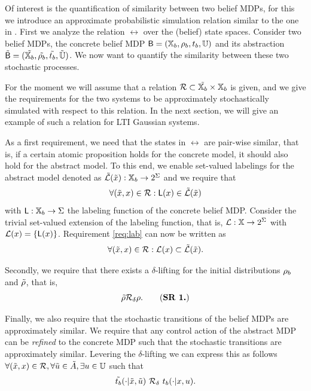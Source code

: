 \documentclass{ifacconf}
\begin{document}
 Of interest is the quantification of similarity between two belief MDPs, for this we introduce an approximate probabilistic simulation relation similar to the one in \citep{haesaert2017verification}.
   First we analyze the relation $\rel$ over the (belief) state spaces.
\color{blue} Consider two belief MDPs, the concrete belief MDP $\mathsf{B}= ({{\mathbb{X}}_b}, \rho_b, t_b, {\mathbb{U}})$  and its abstraction $\tilde {\mathsf{B}}=(\tilde{{{\mathbb{X}}_b}}, \tilde{\rho_b}, \tilde{t_b}, \tilde{{\mathbb{U}}})$. 
We now want to quantify the similarity between these two stochastic processes.

  For the moment we will assume that a relation $\mathcal{R}\subset \tilde {{{\mathbb{X}}_b}} \times {{\mathbb{X}}_b}$ is given, and we give the requirements for the two systems to be approximately stochastically simulated with respect to this relation. In the next section, we will give an example of such a relation for LTI Gaussian systems. 

As a first requirement, we need that the states in $\rel$ are pair-wise similar, that is, if a certain atomic proposition holds for the concrete model, it should also hold for the abstract model. To this end, we enable set-valued labelings for the abstract model denoted as  $ \tilde{\mathcal{L}}(\tilde x):{{\mathbb{X}}_b}\rightarrow2^\Sigma$ and we require that  \begin{equation}\label{req:lab}
  \forall (\tilde x,x )\in \mathcal{R}:  \mathsf{L}(x)\in \tilde{\mathcal{L}}(\tilde x)
  \end{equation} with $\mathsf{L}:{{\mathbb{X}}_b}\rightarrow\Sigma$ the labeling function of the concrete belief MDP.
Consider 
 the trivial set-valued extension of  the labeling function, that is,  $\mathcal{L}:{\mathbb{X}}\rightarrow2^\Sigma$ with
 $\mathcal{L}(x)=\{\mathsf{L}(x)\}$.
Requirement \eqref{req:lab} can now be written as  \begin{equation}
  \forall (\tilde x,x )\in \mathcal{R}:  \mathcal{L}(x)\subset \tilde{\mathcal{L}}(\tilde x).
  \end{equation} 
  
Secondly, we require that there exists a $\delta$-lifting for the initial distributions $\rho_b$ and $\tilde{\rho}$, that is,
\begin{equation}
\tilde\init \bar \rel_\delta \init.
	\tag{\textbf{SR 1.}}
\end{equation}

Finally, we also require that the stochastic transitions of the belief MDPs are approximately similar.  We require that any control action of the abstract MDP can be \emph{refined} to the concrete MDP such that the stochastic transitions are approximately similar. Levering the $\delta$-lifting  we can  express this as follows $\forall (\tilde x, x)\in \mathcal{R}, \forall \tilde u \in \tilde A, \exists u \in {\mathbb{U}}$ such that 
\begin{equation}\label{req:translifting}
	\tilde {t_b}(\cdot| \tilde x, \tilde u)\ \relax \mathcal{R}_\delta \  t_b(\cdot| x, u).
\end{equation}
\end{document}
